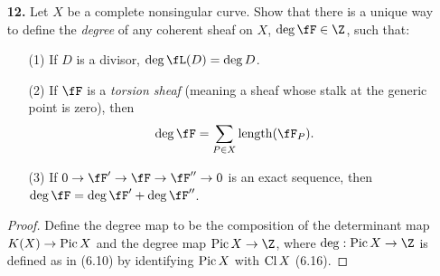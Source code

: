 \documentclass[a4paper]{article}
\begin{document}
\begin{enumerate} [label=\textbf{\arabic*.}, leftmargin=0em]
\begin{proof}
\begin{itemize} [leftmargin=0cm]
\item[(b)] Let $U_i = \spec{A_i}$ be an open affine cover of $X$ such that $\restr{\fF}{U_i} \cong \widetilde{M}_i$ for some finitely generated $A_i$-module.
Since $X$ is noetherian, a finite number will do, and let $N > 0$ such that the minimal number of generators for $M_i$ is at most $N$ for all $i$.
\end{itemize} 
\end{proof}

\item[\textbf{12.}] Let $X$ be a complete nonsingular curve.
Show that there is a unique way to define the \textit{degree} of any coherent sheaf on $X$, $\deg \fF \in \Z$, such that:
\begin{itemize}
    \item[(1)] If $D$ is a divisor, $\deg \fL(D) = \deg D$.
    \item[(2)] If $\fF$ is a \textit{torsion sheaf} (meaning a sheaf whose stalk at the generic point is zero), then $$\deg \fF = \sum_{P \in X} \len(\fF_P).$$
    \item[(3)] If $0 \to \fF' \to \fF \to \fF'' \to 0$ is an exact sequence, then $\deg \fF = \deg \fF' + \deg \fF''$.
\end{itemize}

\begin{proof} 
    Define the degree map to be the composition of the determinant map $K(X) \to \operatorname{Pic}{X}$ and the degree map $\pic{X} \to \Z$, where $\deg : \pic{X} \to \Z$ is defined as in (6.10) by identifying $\operatorname{Pic}{X}$ with $\operatorname{Cl}{X}$ (6.16).
\end{proof}

\end{enumerate}
\end{document}
